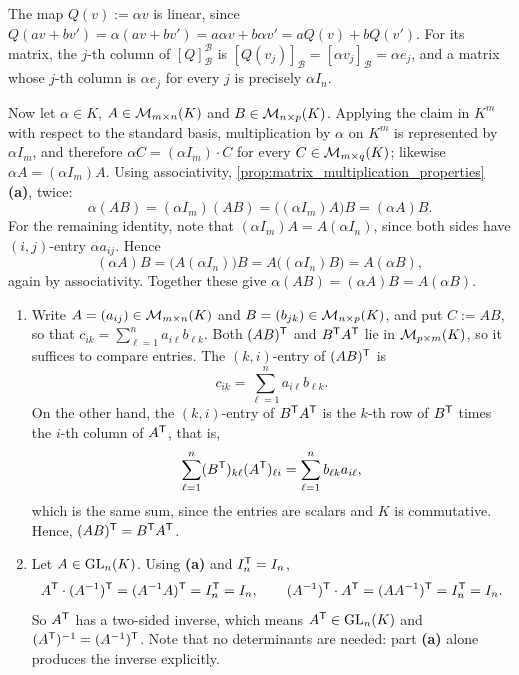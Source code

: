 \begin{exercisesolution}
\label{sol:scaling_map_matrix_d}
The map $Q(v) := \alpha v$ is linear, since $Q(a v + b v') = \alpha(a v + b v') = a \alpha v + b \alpha v' = a Q(v) + b Q(v')$. For its matrix, the $j$-th column of $[Q]_{\mathcal{B}}^{\mathcal{B}}$ is $[Q(v_j)]_{\mathcal{B}} = [\alpha v_j]_{\mathcal{B}} = \alpha e_j$, and a matrix whose $j$-th column is $\alpha e_j$ for every $j$ is precisely $\alpha I_n$.

Now let $\alpha \in K$, $A \in \mathcal{M}_{m \times n}(K)$ and $B \in \mathcal{M}_{n \times p}(K)$. Applying the claim in $K^m$ with respect to the standard basis, multiplication by $\alpha$ on $K^m$ is represented by $\alpha I_m$, and therefore $\alpha C = (\alpha I_m) \cdot C$ for every $C \in \mathcal{M}_{m \times q}(K)$; likewise $\alpha A = (\alpha I_m) A$. Using associativity, \cref{prop:matrix_multiplication_properties} \textbf{(a)}, twice:
\[
\alpha (AB) = (\alpha I_m)(AB) = \big((\alpha I_m) A\big) B = (\alpha A) B.
\]
For the remaining identity, note that $(\alpha I_m) A = A (\alpha I_n)$, since both sides have $(i,j)$-entry $\alpha a_{ij}$. Hence
\[
(\alpha A) B = \big(A (\alpha I_n)\big) B = A \big((\alpha I_n) B\big) = A (\alpha B),
\]
again by associativity. Together these give $\alpha(AB) = (\alpha A)B = A(\alpha B)$.
\end{exercisesolution}

\begin{exercisesolution}
\label{sol:transpose_properties_multiplication}
\begin{enumerate}[label=\textbf{(\alph*)}]
    \item Write $A = (a_{ij}) \in \mathcal{M}_{m \times n}(K)$ and $B = (b_{jk}) \in \mathcal{M}_{n \times p}(K)$, and put $C := AB$, so that $c_{ik} = \sum_{\ell=1}^{n} a_{i\ell} b_{\ell k}$. Both $(AB)^{\mathsf{T}}$ and $B^{\mathsf{T}} A^{\mathsf{T}}$ lie in $\mathcal{M}_{p \times m}(K)$, so it suffices to compare entries. The $(k,i)$-entry of $(AB)^{\mathsf{T}}$ is
    \[
    c_{ik} = \sum_{\ell=1}^{n} a_{i\ell} b_{\ell k}.
    \]
    On the other hand, the $(k,i)$-entry of $B^{\mathsf{T}} A^{\mathsf{T}}$ is the $k$-th row of $B^{\mathsf{T}}$ times the $i$-th column of $A^{\mathsf{T}}$, that is,
    \[
    \sum_{\ell=1}^{n} (B^{\mathsf{T}})_{k\ell} (A^{\mathsf{T}})_{\ell i} = \sum_{\ell=1}^{n} b_{\ell k} a_{i \ell},
    \]
    which is the same sum, since the entries are scalars and $K$ is commutative. Hence, $(AB)^{\mathsf{T}} = B^{\mathsf{T}} A^{\mathsf{T}}$.
    \item Let $A \in \operatorname{GL}_n(K)$. Using \textbf{(a)} and $I_n^{\mathsf{T}} = I_n$,
    \[
    A^{\mathsf{T}} \cdot (A^{-1})^{\mathsf{T}} = (A^{-1} A)^{\mathsf{T}} = I_n^{\mathsf{T}} = I_n, \qquad (A^{-1})^{\mathsf{T}} \cdot A^{\mathsf{T}} = (A A^{-1})^{\mathsf{T}} = I_n^{\mathsf{T}} = I_n.
    \]
    So $A^{\mathsf{T}}$ has a two-sided inverse, which means $A^{\mathsf{T}} \in \operatorname{GL}_n(K)$ and $(A^{\mathsf{T}})^{-1} = (A^{-1})^{\mathsf{T}}$. Note that no determinants are needed: part \textbf{(a)} alone produces the inverse explicitly.
\end{enumerate}
\end{exercisesolution}

